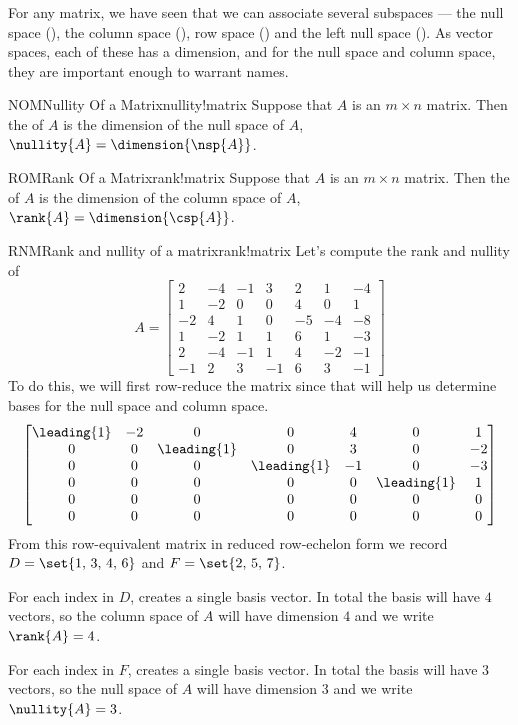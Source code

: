 %
%
For any matrix, we have seen that we can associate several subspaces --- the null space (), the column space (), row space () and the left null space  ().  As vector spaces, each of these has a dimension, and for the null space and column space, they are important enough to warrant names. %
%
\begin{definition}{NOM}{Nullity Of a Matrix}{nullity!matrix}
Suppose that $A$ is an $m\times n$ matrix.  Then the  of $A$ is the dimension of the null space of $A$, $\nullity{A}=\dimension{\nsp{A}}$.
\end{definition}
%
\begin{definition}{ROM}{Rank Of a Matrix}{rank!matrix}
Suppose that $A$ is an $m\times n$ matrix.  Then the  of $A$ is the dimension of the column space of $A$, $\rank{A}=\dimension{\csp{A}}$.
\end{definition}
%
\begin{example}{RNM}{Rank and nullity of a matrix}{rank!matrix}
Let's compute the rank and nullity of
%
\begin{equation*}
A=\begin{bmatrix}
2 & -4 & -1 & 3 & 2 & 1 & -4\\
1 & -2 & 0 & 0 & 4 & 0 & 1\\
-2 & 4 & 1 & 0 & -5 & -4 & -8\\
1 & -2 & 1 & 1 & 6 & 1 & -3\\
2 & -4 & -1 & 1 & 4 & -2 & -1\\
-1 & 2 & 3 & -1 & 6 & 3 & -1
\end{bmatrix}
\end{equation*}
%
To do this, we will first row-reduce the matrix since that will help us determine bases for the null space and column space.
%
\begin{equation*}
\begin{bmatrix}
\leading{1} & -2 & 0 & 0 & 4 & 0 & 1\\
0 & 0 & \leading{1} & 0 & 3 & 0 & -2\\
0 & 0 & 0 & \leading{1} & -1 & 0 & -3\\
0 & 0 & 0 & 0 & 0 & \leading{1} & 1\\
0 & 0 & 0 & 0 & 0 & 0 & 0\\
0 & 0 & 0 & 0 & 0 & 0 & 0
\end{bmatrix}
\end{equation*}
%
From this row-equivalent matrix in reduced row-echelon form we record $D=\set{1,\,3,\,4,\,6}$ and $F=\set{2,\,5,\,7}$.\par
%
For each index in $D$,  creates a single basis vector.  In total the basis will have $4$ vectors, so the column space of $A$ will have dimension $4$ and we write $\rank{A}=4$.\par
%
For each index in $F$,  creates a single basis vector.  In total the basis will have $3$ vectors, so the null space of $A$ will have dimension $3$ and we write $\nullity{A}=3$.
%
\end{example}
